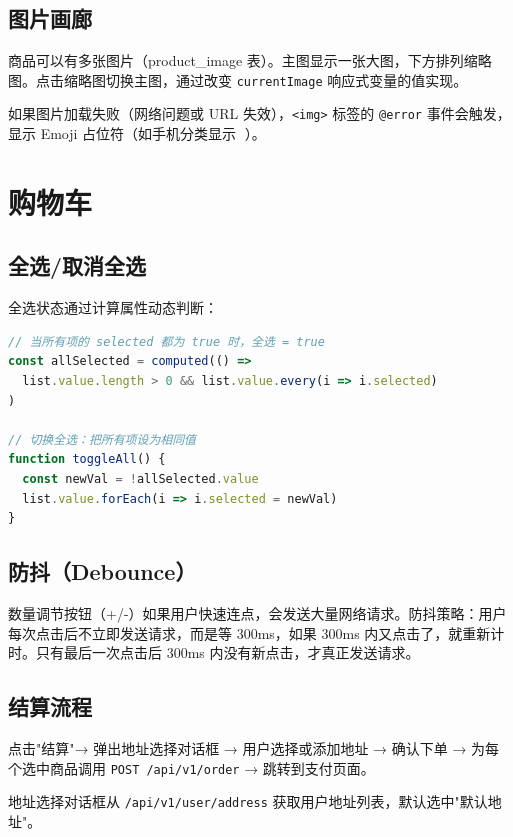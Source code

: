 \documentclass[12pt,a4paper]{ctexart}
\begin{document}
\subsection{图片画廊}

商品可以有多张图片（product\_image 表）。主图显示一张大图，下方排列缩略图。点击缩略图切换主图，通过改变 \texttt{currentImage} 响应式变量的值实现。

如果图片加载失败（网络问题或 URL 失效），\texttt{<img>} 标签的 \texttt{@error} 事件会触发，显示 Emoji 占位符（如手机分类显示 📱）。

\section{购物车}

\subsection{全选/取消全选}

全选状态通过计算属性动态判断：

\begin{lstlisting}[language=JavaScript]
// 当所有项的 selected 都为 true 时，全选 = true
const allSelected = computed(() =>
  list.value.length > 0 && list.value.every(i => i.selected)
)

// 切换全选：把所有项设为相同值
function toggleAll() {
  const newVal = !allSelected.value
  list.value.forEach(i => i.selected = newVal)
}
\end{lstlisting}

\subsection{防抖（Debounce）}

数量调节按钮（+/-）如果用户快速连点，会发送大量网络请求。防抖策略：用户每次点击后不立即发送请求，而是等 300ms，如果 300ms 内又点击了，就重新计时。只有最后一次点击后 300ms 内没有新点击，才真正发送请求。

\subsection{结算流程}

点击"结算"→ 弹出地址选择对话框 → 用户选择或添加地址 → 确认下单 → 为每个选中商品调用 \texttt{POST /api/v1/order} → 跳转到支付页面。

地址选择对话框从 \texttt{/api/v1/user/address} 获取用户地址列表，默认选中"默认地址"。
\end{document}
